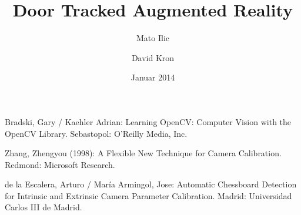 \documentclass[listof=totocnumbered,bibliography=totocnumbered,12pt,oneside]{scrreprt}
\numberwithin{equation}{subsection}
\begin{document}
\pagestyle{fancy}

\subject{Bachelor-Thesis}
\title{Door Tracked Augmented Reality}
\author{Mato Ilic \and David Kron}
\date{Januar 2014}
\publishers{Betreuer: Marcus Hudritsch\\Experte: Andreas Dürsteler}

\maketitle


\newpage

\tableofcontents
\newpage


\newpage


\newpage


\newpage

%


\newpage


\newpage


\newpage
\begin{thebibliography}{5}

Bradski, Gary / Kaehler Adrian:
Learning OpenCV: Computer Vision with the OpenCV Library.
Sebastopol: O'Reilly Media, Inc.

Zhang, Zhengyou (1998): A Flexible New Technique for Camera Calibration. 
Redmond: Microsoft Research.

de la Escalera, Arturo / María Armingol, Jose: Automatic Chessboard Detection for Intrinsic and Extrinsic Camera Parameter Calibration. 
Madrid: Universidad Carlos III de Madrid.

\end{thebibliography}
\end{document}

